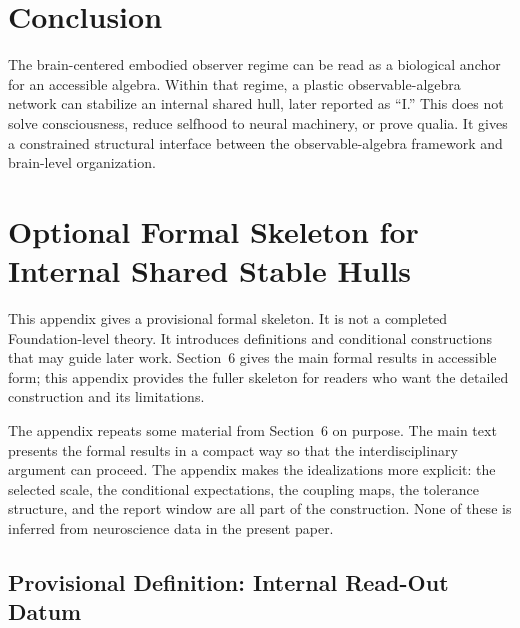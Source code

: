 \documentclass[12pt]{article}
\theoremstyle{definition}
\theoremstyle{remark}
\begin{document}
\section{Conclusion}

The brain-centered embodied observer regime can be read as a biological
anchor for an accessible algebra. Within that regime, a plastic
observable-algebra network can stabilize an internal shared hull, later
reported as ``I.'' This does not solve consciousness, reduce selfhood to
neural machinery, or prove qualia. It gives a constrained structural
interface between the observable-algebra framework and brain-level
organization.

\appendix

\section{Optional Formal Skeleton for Internal Shared Stable Hulls}

This appendix gives a provisional formal skeleton. It is not a
completed Foundation-level theory. It introduces definitions and
conditional constructions that may guide later work.
Section~6 gives the main formal results in accessible form; this
appendix provides the fuller skeleton for readers who want the detailed
construction and its limitations.

The appendix repeats some material from Section~6 on purpose. The main
text presents the formal results in a compact way so that the
interdisciplinary argument can proceed. The appendix makes the
idealizations more explicit: the selected scale, the conditional
expectations, the coupling maps, the tolerance structure, and the report
window are all part of the construction. None of these is inferred from
neuroscience data in the present paper.

\subsection{Provisional Definition: Internal Read-Out Datum}
\end{document}
